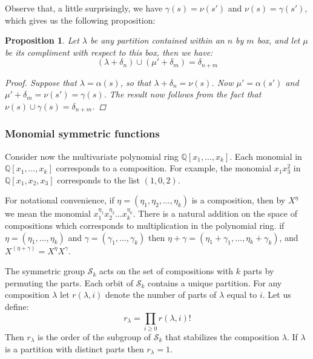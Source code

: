 \documentclass[12pt,dvips]{amsart}
\newtheorem{proposition}{Proposition}[section]
\begin{document}
Observe that, a little surprisingly, we have $\gamma(s) = \nu(s')$ and $\nu({s}) = \gamma(s')$, which gives us the following proposition:
\begin{proposition} \label{flip} Let $\lambda$ be any partition contained within an $n$ by $m$ box, and let $\mu$ be its compliment with respect to this box, then we have:
$$ (\lambda + \delta_n) \cup (\mu' + \delta_m) = \delta_{n + m} $$
\begin{proof}
Suppose that $\lambda = \alpha(s)$, so that $\lambda + \delta_n = \nu(s)$. Now $\mu' = \alpha(s')$ and $\mu' + \delta_m = \nu(s') = \gamma(s)$. The result now follows from the fact that $\nu(s)\cup \gamma(s) = \delta_{n+m}$.
\end{proof}

\end{proposition}


\subsubsection{Monomial symmetric functions}
Consider now the multivariate polynomial ring $\mathbb{Q}[x_1, \ldots, x_k]$. 
Each monomial in $\mathbb{Q}[x_1, \ldots, x_k]$ corresponds to a composition. For example, the monomial $x_1 x_3^2$ in $\mathbb{Q}[x_1,x_2,x_3]$ corresponds to the list $(1,0,2)$.

For notational convenience,
if $\eta = (\eta_1, \eta_2, \ldots, \eta_k)$ is a composition, then by $X^\eta$ we mean the monomial $x_1^{\eta_1} x_2^{\eta_2} \ldots x_k^{\eta_k}$. There is a natural addition on the space of compositions which corresponds to multiplication in the polynomial ring. if $\eta = (\eta_1, \ldots, \eta_k)$ and $\gamma = (\gamma_1,  \ldots, \gamma_k)$ then $\eta + \gamma = (\eta_1 + \gamma_1,  \ldots, \eta_k + \gamma_k)$, and $X^{(\eta + \gamma)} = X^\eta X^\gamma$.

\par\bigskip

The symmetric group $\mathcal{S}_k$ acts on the set of compositions with $k$ parts  by permuting the parts. Each orbit of $\mathcal{S}_k$ contains a unique partition. 
For any composition $\lambda$ let $r(\lambda,i)$ denote the number of parts of $\lambda$ equal to $i$. Let us define:
$$r_\lambda = \prod_{i \geq 0} r(\lambda,i)!$$
Then $r_\lambda$ is the order of the subgroup of $\mathcal{S}_k$ that stabilizes the composition ${\lambda}$. If $\lambda$ is a partition with distinct parts then $r_\lambda = 1$.
 
\par\bigskip
\end{document}
